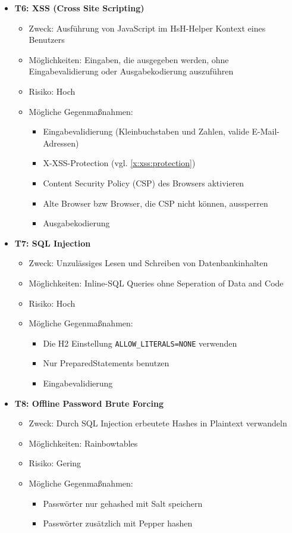 \documentclass[12pt,DIV14,BCOR10mm,a4paper,parskip=half-,headsepline,headinclude,english,ngerman,bibliography=totocnumbered]{scrreprt}
\begin{document}
\begin{itemize}
  \hypertarget{threat6}{}
  \item \textbf{T6: XSS (Cross Site Scripting)}
  \begin{itemize}
  \item Zweck: Ausführung von JavaScript im HsH-Helper Kontext eines Benutzers
  \item Möglichkeiten: Eingaben, die ausgegeben werden, ohne Eingabevalidierung oder Ausgabekodierung auszuführen
  \item Risiko: Hoch
  \item Mögliche Gegenmaßnahmen:
	\begin{itemize}
		\item Eingabevalidierung (Kleinbuchstaben und Zahlen, valide E-Mail-Adressen)
		\item X-XSS-Protection (vgl. \ref{x:xss:protection})
		\item Content Security Policy (CSP) des Browsers aktivieren
		\item Alte Browser bzw Browser, die CSP nicht können, aussperren
		\item Ausgabekodierung
	\end{itemize}
  \end{itemize}

  \hypertarget{threat7}{}
  \item \textbf{T7: SQL Injection}
  \begin{itemize}
  \item Zweck: Unzulässiges Lesen und Schreiben von Datenbankinhalten
  \item Möglichkeiten: Inline-SQL Queries ohne Seperation of Data and Code
  \item Risiko: Hoch
  \item Mögliche Gegenmaßnahmen:
  \begin{itemize}
    \item Die H2 Einstellung \texttt{ALLOW\_LITERALS=NONE} verwenden
    \item Nur PreparedStatements benutzen
    \item Eingabevalidierung
  \end{itemize}
  \end{itemize}

  \hypertarget{threat8}{}
  \item \textbf{T8: Offline Password Brute Forcing}
  \begin{itemize}
  \item Zweck: Durch SQL Injection erbeutete Hashes in Plaintext verwandeln
  \item Möglichkeiten: Rainbowtables
  \item Risiko: Gering
  \item Mögliche Gegenmaßnahmen:
  \begin{itemize}
    \item Passwörter nur gehashed mit Salt speichern
    \item Passwörter zusätzlich mit Pepper hashen
  \end{itemize}
  \end{itemize}


\end{itemize}
\end{document}
